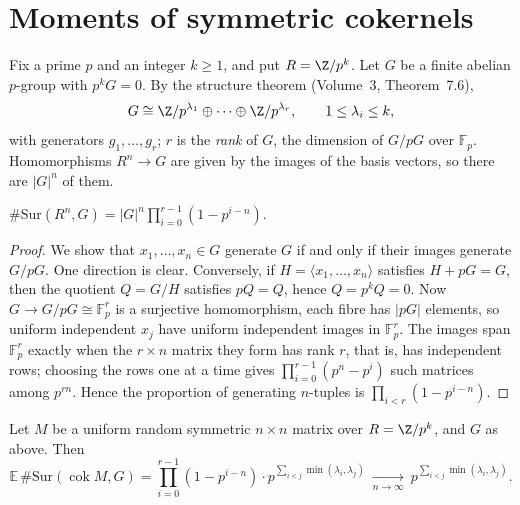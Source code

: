 \section{Moments of symmetric cokernels}

Fix a prime $p$ and an integer $k\ge1$, and put $R=\Z/p^k$. Let $G$ be a finite abelian $p$-group with $p^kG=0$. By the structure theorem (Volume~3, Theorem~7.6),
\[
G\cong\Z/p^{\lambda_1}\oplus\dots\oplus\Z/p^{\lambda_r},\qquad1\le\lambda_i\le k,
\]
with generators $g_1,\dots,g_r$; $r$ is the \emph{rank} of $G$, the dimension of $G/pG$ over $\mathbb F_p$. Homomorphisms $R^n\to G$ are given by the images of the basis vectors, so there are $|G|^n$ of them.

\begin{lemma}\label{lem:countsur}
$\#\mathrm{Sur}(R^n,G)=|G|^n\prod_{i=0}^{r-1}(1-p^{i-n})$.
\end{lemma}

\begin{proof}
We show that $x_1,\dots,x_n\in G$ generate $G$ if and only if their images generate $G/pG$. One direction is clear. Conversely, if $H=\langle x_1,\dots,x_n\rangle$ satisfies $H+pG=G$, then the quotient $Q=G/H$ satisfies $pQ=Q$, hence $Q=p^kQ=0$. Now $G\to G/pG\cong\mathbb F_p^r$ is a surjective homomorphism, each fibre has $|pG|$ elements, so uniform independent $x_j$ have uniform independent images in $\mathbb F_p^r$. The images span $\mathbb F_p^r$ exactly when the $r\times n$ matrix they form has rank $r$, that is, has independent rows; choosing the rows one at a time gives $\prod_{i=0}^{r-1}(p^n-p^i)$ such matrices among $p^{rn}$. Hence the proportion of generating $n$-tuples is $\prod_{i<r}(1-p^{i-n})$.
\end{proof}

\begin{theorem}\label{thm:symmoments}
Let $M$ be a uniform random symmetric $n\times n$ matrix over $R=\Z/p^k$, and $G$ as above. Then
\[
\mathbb E\,\#\mathrm{Sur}(\operatorname{cok}M,G)=\prod_{i=0}^{r-1}(1-p^{i-n})\cdot p^{\sum_{i<j}\min(\lambda_i,\lambda_j)}
\ \xrightarrow[n\to\infty]{}\ p^{\sum_{i<j}\min(\lambda_i,\lambda_j)}.
\]
\end{theorem}

